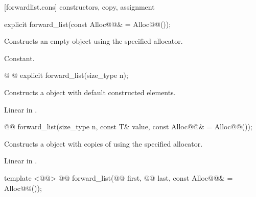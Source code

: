\documentclass[american,twoside]{book}
\begin{document}
[forwardlist.cons]{ constructors, copy, assignment}

\begin{itemdecl}
explicit forward_list(const Alloc@@& = Alloc@@());
\end{itemdecl}

\begin{itemdescr}
\pnum
\effects Constructs an empty  object using the specified allocator.

\pnum
\complexity Constant.
\end{itemdescr}

\begin{itemdecl}
@ @ 
  explicit forward_list(size_type n);
\end{itemdecl}

\begin{itemdescr}
\pnum
\effects Constructs a  object with  default constructed elements.

\pnum
{}

\pnum
\complexity Linear in .
\end{itemdescr}

\begin{itemdecl}
@@ 
  forward_list(size_type n, const T& value, const Alloc@@& = Alloc@@());
\end{itemdecl}

\begin{itemdescr}
\pnum
\effects Constructs a  object with  copies of  using the specified allocator.

\pnum
{}

\pnum
\complexity Linear in .
\end{itemdescr}

\begin{itemdecl}
template <@@>
  @@
  forward_list(@@ first, @@ last, 
               const Alloc@@& = Alloc@@()); 
\end{itemdecl}
\end{document}
